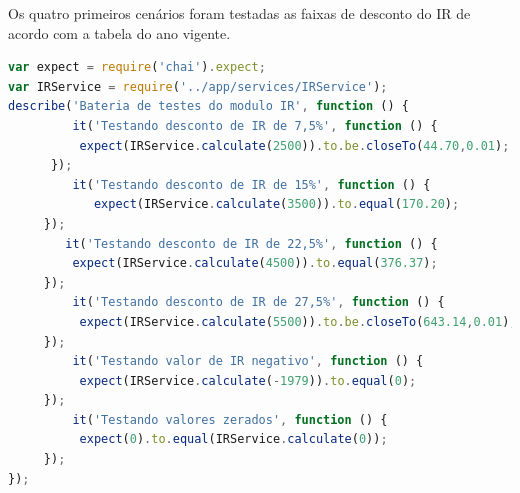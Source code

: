 \par Os quatro primeiros cenários foram testadas as faixas de desconto do IR de acordo com a tabela do ano vigente.


\begin{lstlisting}[language=JavaScript, caption={[Criação de todos os testes IR.]{Criação de todos os testes IR.  \textbf{Fonte:} Elaborado pelos autores.}}]
var expect = require('chai').expect;
var IRService = require('../app/services/IRService');
describe('Bateria de testes do modulo IR', function () {
         it('Testando desconto de IR de 7,5%', function () {
          expect(IRService.calculate(2500)).to.be.closeTo(44.70,0.01);
      });
         it('Testando desconto de IR de 15%', function () {
            expect(IRService.calculate(3500)).to.equal(170.20);
     });
        it('Testando desconto de IR de 22,5%', function () {
         expect(IRService.calculate(4500)).to.equal(376.37);
     });
         it('Testando desconto de IR de 27,5%', function () {
          expect(IRService.calculate(5500)).to.be.closeTo(643.14,0.01);
     });
         it('Testando valor de IR negativo', function () {
          expect(IRService.calculate(-1979)).to.equal(0);
     });
         it('Testando valores zerados', function () {
          expect(0).to.equal(IRService.calculate(0));
     });
});

\end{lstlisting}

